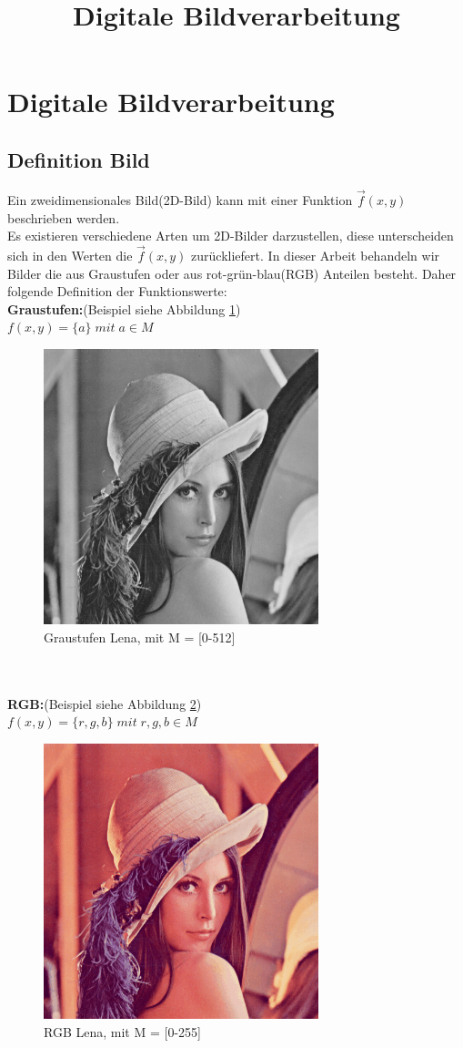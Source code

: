 \documentclass[13]{article}
\title{Digitale Bildverarbeitung}
\newcommand*{\captionsource}[2]{%
  \caption[{#1}]{%
    #1%
  }%
}
\begin{document}
\section{Digitale Bildverarbeitung}
\subsection{Definition Bild}
Ein zweidimensionales Bild(2D-Bild) kann mit einer Funktion $\vec{f}(x,y)$ beschrieben werden.\\
Es existieren verschiedene Arten um 2D-Bilder darzustellen, diese unterscheiden sich in den Werten die $\vec{f}(x,y)$ zurückliefert. In dieser Arbeit behandeln wir Bilder die aus Graustufen oder aus rot-grün-blau(RGB) Anteilen besteht. Daher folgende Definition der Funktionswerte:\\\newline
\textbf{Graustufen:}(Beispiel siehe Abbildung \ref{fig:lena_gray})\\
$f(x,y) = \{a\} \;mit\;a \in M$
\begin{figure} [ht]
  \centering
  \includegraphics[height=8cm,width=8cm]{Bilder/lena_gray}
  \captionsource{Graustufen Lena, mit M = [0-512]}{https://www.cosy.sbg.ac.at/~pmeerw/Watermarking/lena.html}
  \label{fig:lena_gray}
\end{figure}\\
\\
\textbf{RGB:}(Beispiel siehe Abbildung \ref{fig:lena_rgb})\\
$f(x,y) = \{r,g,b\} \;mit\;r,g,b \in M$
\begin{figure} [ht]
  \centering
  \includegraphics[height=8cm,width=8cm]{Bilder/lena_rgb}
  \captionsource{RGB Lena, mit M = [0-255]}{https://www.cosy.sbg.ac.at/~pmeerw/Watermarking/lena.html}
  \label{fig:lena_rgb}
\end{figure}
\newpage
\end{document}
